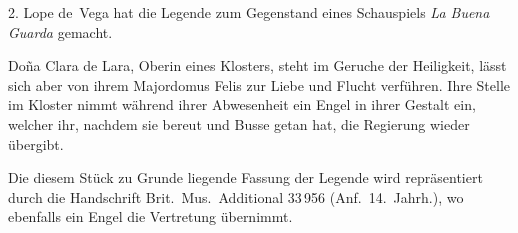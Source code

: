 2. Lope de~Vega hat die Legende zum Gegenstand eines Schauspiels
{\it\spanish La Buena Guarda} gemacht.

Doña Clara de Lara, Oberin eines Klosters, steht im Geruche der
Heiligkeit, lässt sich aber von ihrem Majordomus Felis zur Liebe und
Flucht verführen. Ihre Stelle im Kloster nimmt während ihrer Abwesenheit
ein Engel in ihrer Gestalt ein, welcher ihr, nachdem sie bereut und
Busse getan hat, die Regierung wieder übergibt.

Die diesem Stück zu Grunde liegende Fassung der Legende wird
repräsentiert durch die Handschrift Brit.\ Mus.\ Additional 33\,956
(Anf.\ 14.~Jahrh.), wo ebenfalls ein Engel die Vertretung übernimmt.
